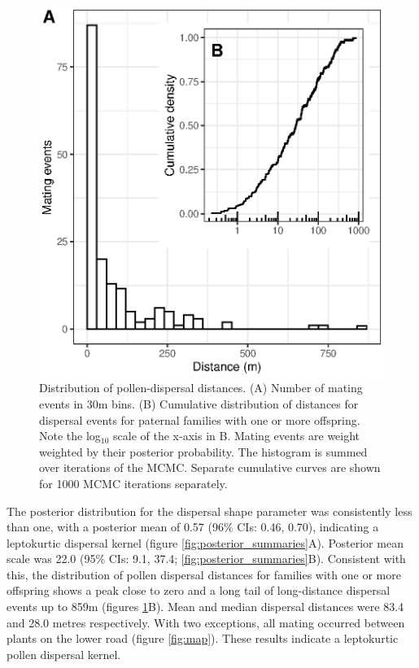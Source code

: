 \documentclass[10pt, a4paper, twocolumn]{article} %
\begin{document}
\begin{figure}
    \centering
    \includegraphics{fig-dispersal.eps}
    \caption{
        Distribution of pollen-dispersal distances.
        (A) Number of mating events in 30m bins.
        (B) Cumulative distribution of distances for dispersal events for paternal families with one or more offspring.
        Note the log$_{10}$ scale of the x-axis in B.
        Mating events are weight weighted by their posterior probability.
        The histogram is summed over iterations of the MCMC.
        Separate cumulative curves are shown for 1000 MCMC iterations separately.
    }
    \label{fig:dispersal}
\end{figure}

The posterior distribution for the dispersal shape parameter was consistently less than one, with a posterior mean of 0.57 (96\% CIs: 0.46, 0.70), indicating a leptokurtic dispersal kernel (figure \ref{fig:posterior_summaries}A).
Posterior mean scale was 22.0 (95\% CIs: 9.1, 37.4; \ref{fig:posterior_summaries}B).
Consistent with this, the distribution of pollen dispersal distances for families with one or more offspring shows a peak close to zero and a long tail of long-distance dispersal events up to 859m (figures \ref{fig:dispersal}B).
Mean and median dispersal distances were 83.4 and 28.0 metres respectively.
With two exceptions, all mating occurred between plants on the lower road (figure \ref{fig:map}).
These results indicate a leptokurtic pollen dispersal kernel.
\end{document}
